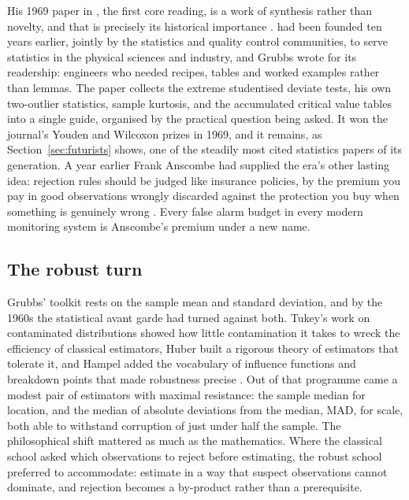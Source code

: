 His 1969 paper in , the first core reading, is a work of
synthesis rather than novelty, and that is precisely its historical
importance \citep{grubbs1969}.  had been founded ten
years earlier, jointly by the statistics and quality control communities, to
serve statistics in the physical sciences and industry, and Grubbs wrote for
its readership: engineers who needed recipes, tables and worked examples
rather than lemmas. The paper collects the extreme studentised deviate tests,
his own two-outlier statistics, sample kurtosis, and the accumulated critical
value tables into a single guide, organised by the practical question being
asked. It won the journal's Youden and Wilcoxon prizes in 1969, and it
remains, as Section~\ref{sec:futurists} shows, one of the steadily most cited
statistics papers of its generation. A year earlier Frank Anscombe had
supplied the era's other lasting idea: rejection rules should be judged like
insurance policies, by the premium you pay in good observations wrongly
discarded against the protection you buy when something is genuinely wrong
\citep{anscombe1960}. Every false alarm budget in every modern monitoring
system is Anscombe's premium under a new name.

\subsection{The robust turn}

Grubbs' toolkit rests on the sample mean and standard deviation, and by the
1960s the statistical avant garde had turned against both. Tukey's work on
contaminated distributions showed how little contamination it takes to wreck
the efficiency of classical estimators, Huber built a rigorous theory of
estimators that tolerate it, and Hampel added the vocabulary of influence
functions and breakdown points that made robustness precise
\citep{hampel1974}. Out of that programme came a modest pair of estimators
with maximal resistance: the sample median for location, and the median of
absolute deviations from the median, MAD, for scale, both able to withstand
corruption of just under half the sample. The philosophical shift mattered as
much as the mathematics. Where the classical school asked which observations
to reject before estimating, the robust school preferred to accommodate:
estimate in a way that suspect observations cannot dominate, and rejection
becomes a by-product rather than a prerequisite.

